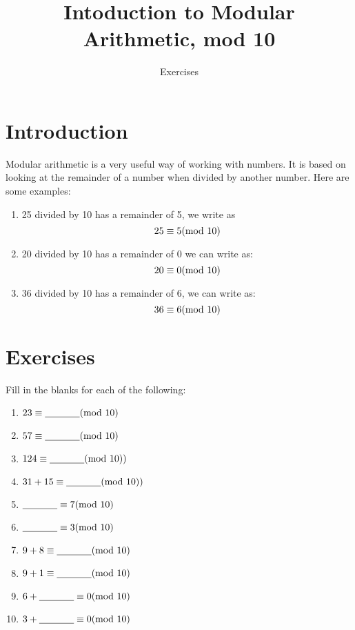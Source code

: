\documentclass[11pt]{article}
\title{Intoduction to Modular Arithmetic, mod 10}
\author{Exercises}
\newcommand{\mblank}{\hbox{\underline{\hspace{0.5in}}}}
\begin{document}
\maketitle
\section{Introduction}
Modular arithmetic is a very useful way of working with numbers.  It is
based on looking at the remainder of a number when divided by another
number.  Here are some examples:
\begin{enumerate}
	\item 25 divided by 10 has a remainder of 5, we write as
	$$25 \equiv 5 (\hbox{mod } 10)$$
	\item 20 divided by 10 has a remainder of 0 we can write as:
	$$20 \equiv 0 (\hbox{mod } 10)$$
	\item 36 divided by 10 has a remainder of 6, we can write as:
	$$36 \equiv 6 (\hbox{mod } 10)$$
\end{enumerate}

\section{Exercises}
Fill in the blanks for each of the following:
\begin{enumerate}
	\item $23 \equiv \mblank{}(\hbox{mod }10)$
	\item $57 \equiv \mblank{}(\hbox{mod }10)$
	\item $124 \equiv \mblank{}(\hbox{mod }10))$
	\item $31+15 \equiv \mblank{}(\hbox{mod }10))$
	\item $\mblank{} \equiv 7 (\hbox{mod } 10)$
	\item $\mblank{} \equiv 3 (\hbox{mod } 10)$
	\item $9+8 \equiv \mblank{}(\hbox{mod } 10)$
	\item $9+1 \equiv \mblank{}(\hbox{mod } 10)$
	\item $6+\mblank{} \equiv 0(\hbox{mod } 10)$
	\item $3+\mblank{} \equiv 0(\hbox{mod } 10)$
\end{enumerate}
\end{document}
